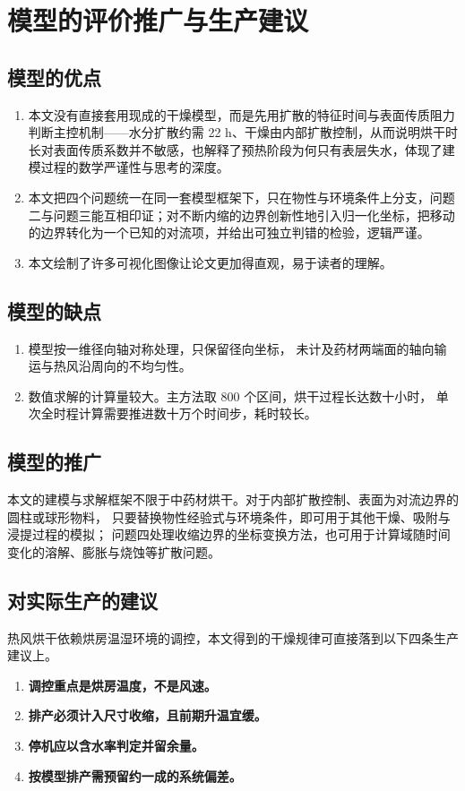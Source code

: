 \section{模型的评价推广与生产建议}

\subsection{模型的优点}

\begin{enumerate}[label=\arabic*., leftmargin=2.6em, itemsep=4pt]
  \item 本文没有直接套用现成的干燥模型，而是先用扩散的特征时间与表面传质阻力判断主控机制——水分扩散约需 22 h、干燥由内部扩散控制，从而说明烘干时长对表面传质系数并不敏感，也解释了预热阶段为何只有表层失水，体现了建模过程的数学严谨性与思考的深度。
  \item 本文把四个问题统一在同一套模型框架下，只在物性与环境条件上分支，问题二与问题三能互相印证；对不断内缩的边界创新性地引入归一化坐标，把移动的边界转化为一个已知的对流项，并给出可独立判错的检验，逻辑严谨。
  \item 本文绘制了许多可视化图像让论文更加得直观，易于读者的理解。
\end{enumerate}

\subsection{模型的缺点}

\begin{enumerate}[label=\arabic*., leftmargin=2.6em, itemsep=4pt]
  \item 模型按一维径向轴对称处理，只保留径向坐标，
        未计及药材两端面的轴向输运与热风沿周向的不均匀性。
  \item 数值求解的计算量较大。主方法取 $800$ 个区间，烘干过程长达数十小时，
        单次全时程计算需要推进数十万个时间步，耗时较长。

\end{enumerate}

\subsection{模型的推广}

本文的建模与求解框架不限于中药材烘干。对于内部扩散控制、表面为对流边界的圆柱或球形物料，
只要替换物性经验式与环境条件，即可用于其他干燥、吸附与浸提过程的模拟；
问题四处理收缩边界的坐标变换方法，也可用于计算域随时间变化的溶解、膨胀与烧蚀等扩散问题。

\subsection{对实际生产的建议}

热风烘干依赖烘房温湿环境的调控，本文得到的干燥规律可直接落到以下四条生产建议上。

\begin{enumerate}[label=\arabic*., leftmargin=2.6em, itemsep=4pt]
  \item \textbf{调控重点是烘房温度，不是风速。} 
  \item \textbf{排产必须计入尺寸收缩，且前期升温宜缓。} 
  \item \textbf{停机应以含水率判定并留余量。} 
  \item \textbf{按模型排产需预留约一成的系统偏差。}
\end{enumerate}
